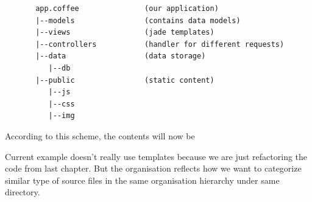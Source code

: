 \documentclass[12pt]{book}
\begin{document}
\begin{verbatim}
       app.coffee               (our application)
       |--models                (contains data models)
       |--views                 (jade templates)
       |--controllers           (handler for different requests)
       |--data                  (data storage)
          |--db
       |--public                (static content)
          |--js
          |--css
          |--img
\end{verbatim}

\par
\vspace{1cm}

According to this scheme, the contents will now be\\
\vspace{0.6cm}
\vspace{0.6cm}
\vspace{0.6cm}
\vspace{0.6cm}

Current example doesn't really use templates because we are just refactoring the code from last chapter. But the organisation reflects how we want to categorize similar type of source files in the same organisation hierarchy under same directory.




\end{document}
